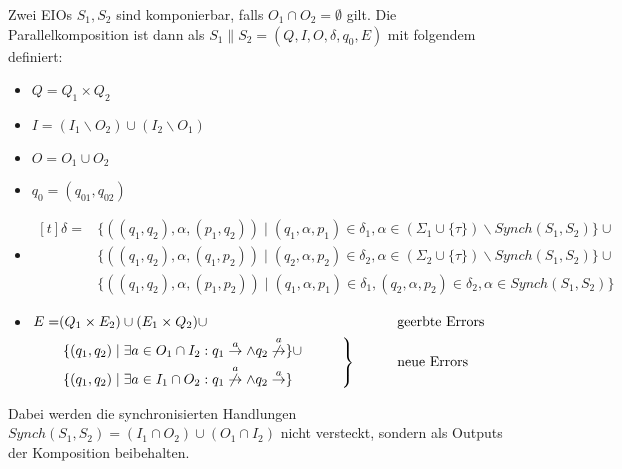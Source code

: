 \begin{Def}[Parallelkomposition]
  Zwei EIOs $S_1, S_2$ sind komponierbar, falls
  $O_1\cap O_2=\emptyset$ gilt. Die Parallelkomposition ist dann als
  $S_1\|S_2=(Q,I,O,\delta ,q_0,E)$ mit folgendem definiert:
  \begin{itemize}
    \item $Q=Q_1\times Q_2$
    \item $I=(I_1\backslash O_2)\cup(I_2\backslash O_1)$
    \item $O=O_1\cup O_2$
    \item $q_0=(q_{01},q_{02})$
    \item $\begin{aligned}[t]
    \delta =&\{((q_1,q_2),\alpha ,(p_1,q_2))\mid (q_1,\alpha ,p_1)\in\delta
      _1,\alpha\in(\Sigma _1\cup\{\tau\})\backslash Synch(S_1,S_2)\}\cup\\
      &\{((q_1,q_2),\alpha ,(q_1,p_2))\mid (q_2,\alpha ,p_2)\in\delta
      _2,\alpha\in(\Sigma _2\cup\{\tau\})\backslash Synch(S_1,S_2)\}\cup\\
      &\{((q_1,q_2),\alpha ,(p_1,p_2))\mid (q_1,\alpha ,p_1)\in\delta
      _1, (q_2,\alpha ,p_2)\in\delta _2, \alpha\in Synch(S_1,S_2)\}
  \end{aligned}$
    \item $\begin{aligned}[t]
        E=&(Q_1\times E_2)\cup (E_1\times Q_2)\cup
        &&\phantom{neue}\mathrm{geerbte}~\mathrm{Errors}\\
        &\left.\begin{aligned}
        &\{(q_1,q_2)\mid \exists a\in O_1\cap I_2: q_1\overset{a}{\rightarrow}\wedge
      q_2\overset{a}{\not{\hspace{-0.1cm}\rightarrow}}\}\cup\\
      &\{(q_1,q_2)\mid \exists a\in I_1\cap O_2:
q_1\overset{a}{\not{\hspace{-0.1cm}\rightarrow}}\wedge
q_2\overset{a}{\rightarrow}\}
\end{aligned}\hspace{1cm}\right\}
      &&\phantom{neue}\mathrm{neue}~\mathrm{Errors}\\
  \end{aligned}$
  \end{itemize}
  Dabei werden die synchronisierten Handlungen $Synch(S_1,
  S_2)=(I_1\cap O_2)\cup(O_1\cap I_2)$ nicht versteckt, sondern als Outputs der
  Komposition beibehalten.
\end{Def}

